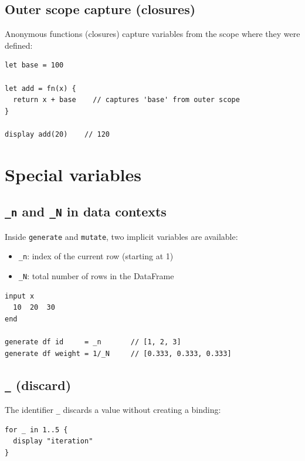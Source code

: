\subsection*{Outer scope capture (closures)}

Anonymous functions (closures) capture variables from the scope where they
were defined:

\begin{lstlisting}
let base = 100

let add = fn(x) {
  return x + base    // captures 'base' from outer scope
}

display add(20)    // 120
\end{lstlisting}

\section{Special variables}

\subsection*{\texttt{\_n} and \texttt{\_N} in data contexts}

Inside \lstinline{generate} and \lstinline{mutate}, two implicit variables
are available:

\begin{itemize}
  \item \lstinline{_n}: index of the current row (starting at 1)
  \item \lstinline{_N}: total number of rows in the DataFrame
\end{itemize}

\begin{lstlisting}[caption={Using \_n and \_N}]
input x
  10  20  30
end

generate df id     = _n       // [1, 2, 3]
generate df weight = 1/_N     // [0.333, 0.333, 0.333]
\end{lstlisting}

\subsection*{\texttt{\_} (discard)}

The identifier \lstinline{_} discards a value without creating a binding:

\begin{lstlisting}
for _ in 1..5 {
  display "iteration"
}
\end{lstlisting}

